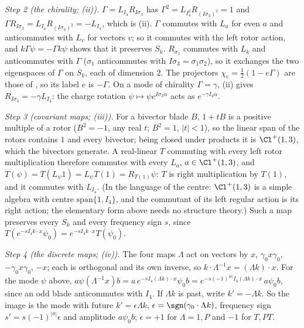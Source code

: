 \emph{Step 2 (the chirality; (ii)).} $\Gamma = L_{I_{4}}R_{I\sigma_{3}}$ has $\Gamma^{2} = L_{I_{4}^{2}}R_{(I\sigma_{3})^{2}} = 1$ and $\Gamma R_{I\sigma_{3}} = L_{I_{4}}R_{(I\sigma_{3})^{2}} = -L_{I_{4}}$, which is (ii). $\Gamma$ commutes with $L_{a}$ for even $a$ and anticommutes with $L_{v}$ for vectors $v$; so it commutes with the left rotor action, and $k\Gamma\psi = -\Gamma k\psi$ shows that it preserves $S_{k}$. $R_{\sigma_{1}}$ commutes with $L_{k}$ and anticommutes with $\Gamma$ ($\sigma_{1}$ anticommutes with $I\sigma_{3} = \sigma_{1}\sigma_{2}$), so it exchanges the two eigenspaces of $\Gamma$ on $S_{k}$, each of dimension $2$. The projectors $\chi_{e} = \tfrac12(1 - e\Gamma)$ are those of , so its label $e$ is $-\Gamma$. On a mode of chirality $\Gamma = \gamma$, (ii) gives $R_{I\sigma_{3}} = -\gamma L_{I_{4}}$: the charge rotation $\psi \mapsto \psi e^{I\sigma_{3}\alpha}$ acts as $e^{-\gamma I_{4}\alpha}$.

\emph{Step 3 (covariant maps; (iii)).} For a bivector blade $B$, $1 + tB$ is a positive multiple of a rotor ($B^{2} = -1$, any real $t$; $B^{2} = 1$, $|t| < 1$), so the linear span of the rotors contains $1$ and every bivector; being closed under products it is $\Cl^{+}(1,3)$, which the bivectors generate. A real-linear $T$ commuting with every left rotor multiplication therefore commutes with every $L_{a}$, $a \in \Cl^{+}(1,3)$, and $T(\psi) = T(L_{\psi}1) = L_{\psi}T(1) = R_{T(1)}\psi$: $T$ is right multiplication by $T(1)$, and it commutes with $L_{I_{4}}$. (In the language of the centre: $\Cl^{+}(1,3)$ is a simple algebra with centre $\mathrm{span}\{1, I_{4}\}$, and the commutant of its left regular action is its right action; the elementary form above needs no structure theory.) Such a map preserves every $S_{k}$ and every frequency sign $s$, since $T(e^{-sI_{4}k\cdot x}\psi_{0}) = e^{-sI_{4}k\cdot x}T(\psi_{0})$.

\emph{Step 4 (the discrete maps; (iv)).} The four maps $\Lambda$ act on vectors by $x$, $\gamma_{0}x\gamma_{0}$, $-\gamma_{0}x\gamma_{0}$, $-x$; each is orthogonal and its own inverse, so $k\cdot\Lambda^{-1}x = (\Lambda k)\cdot x$. For the mode $\psi$ above, $a\psi(\Lambda^{-1}x)b = a\,e^{-sI_{4}(\Lambda k)\cdot x}\psi_{0}b = e^{-s(-1)^{|a|}I_{4}(\Lambda k)\cdot x}\,a\psi_{0}b$, since an odd blade anticommutes with $I_{4}$. If $\Lambda k$ is past, write $k' = -\Lambda k$. So the image is the mode with future $k' = \epsilon\Lambda k$, $\epsilon = \sgn(\gamma_{0}\cdot\Lambda k)$, frequency sign $s' = s(-1)^{|a|}\epsilon$ and amplitude $a\psi_{0}b$; $\epsilon = +1$ for $\Lambda = 1, P$ and $-1$ for $T, PT$.


